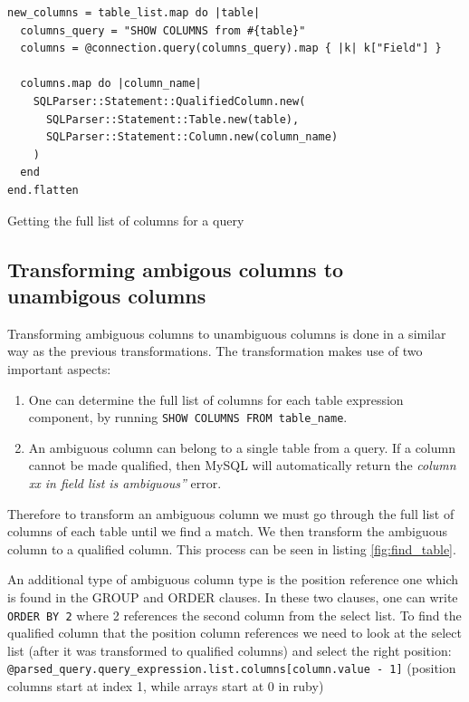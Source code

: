 \begin{listing}
\begin{verbatim}
new_columns = table_list.map do |table|
  columns_query = "SHOW COLUMNS from #{table}"
  columns = @connection.query(columns_query).map { |k| k["Field"] }

  columns.map do |column_name|
    SQLParser::Statement::QualifiedColumn.new(
      SQLParser::Statement::Table.new(table),
      SQLParser::Statement::Column.new(column_name)
    )
  end
end.flatten
\end{verbatim}
\caption{Getting the full list of columns for a query}
\end{listing}

\subsection{Transforming ambigous columns to unambigous columns}
Transforming ambiguous columns to unambiguous columns is done in a similar way as the previous transformations. The transformation makes use of two important aspects:
\begin{enumerate}
    \item One can determine the full list of columns for each table expression component, by running \texttt{SHOW COLUMNS FROM table_name}.
    \item An ambiguous column can belong to a single table from a query. If a column cannot be made qualified, then MySQL will automatically return the \textit{column xx in field list is ambiguous''} error.
\end{enumerate}

Therefore to transform an ambiguous column we must go through the full list of columns of each table until we find a match. We then transform the ambiguous column to a qualified column. This process can be seen in listing \ref{fig:find_table}.

An additional type of ambiguous column type is the position reference one which is found in the GROUP and ORDER clauses. In these two clauses, one can write \texttt{ORDER BY 2} where 2 references the second column from the select list. To find the qualified column that the position column references we need to look at the select list (after it was transformed to qualified columns) and select the right position: \texttt{@parsed_query.query_expression.list.columns[column.value - 1]} (position columns start at index 1, while arrays start at 0 in ruby)

